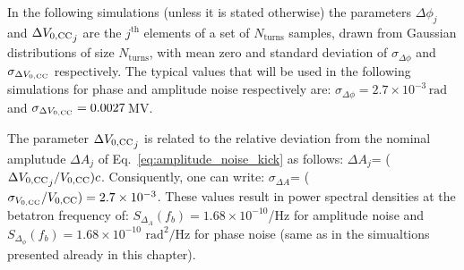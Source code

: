 In the following simulations (unless it is stated otherwise) the parameters $\Delta \phi_j$ and $\Delta {V_\mathrm{0, CC}}_j$ are the $j^\mathrm{th}$ elements of a set of $N_\mathrm{turns}$ samples, drawn from Gaussian distributions of size $N_\mathrm{turns}$, with mean zero and standard deviation of $\sigma_{\Delta \phi}$ and  $\sigma_{\Delta {V_\mathrm{0, CC}}}$ respectively. The typical values that will be used in the following simulations for phase and amplitude noise respectively are: $\sigma_{\Delta \phi}=2.7 \times 10^{-3}$\,$\mathrm{rad}$ and $\sigma_{\Delta {V_\mathrm{0, CC}}}=0.0027$\,MV. 

The parameter $\Delta {V_\mathrm{0, CC}}_j$ is related to the relative deviation from the nominal amplutude $\Delta A_j$ of Eq.~\eqref{eq:amplitude_noise_kick} as follows:  $\Delta A_j$= ($\Delta {V_\mathrm{0, CC}}_j / {V_\mathrm{0, CC}})c$. Consiquently, one can write: $\sigma_{\Delta A}$= ($\sigma_{{V_\mathrm{0, CC}}} / {V_\mathrm{0, CC}}) = 2.7\times 10^{-3}$. These values result in power spectral densities at the betatron frequency of: $S_{\Delta_A}(f_b) = 1.68 \times 10^{-10}$/Hz for amplitude noise and $S_{\Delta_\phi}(f_b) = 1.68 \times 10^{-10}$ $\mathrm{rad^2/Hz}$ for phase noise (same as in the simualtions presented already in this chapter).





